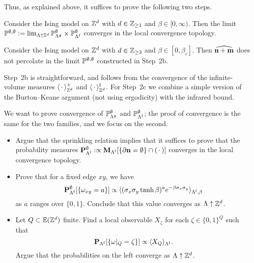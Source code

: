 Thus, as explained above, it suffices to prove the following two steps.

\begin{lemma}\label{lemma:continuity_step2b}
    Consider the Ising model on $\Z^d$ with $d\in\Z_{\geq 1}$
    and $\beta\in[0,\infty)$.
    Then the limit $\P^{\emptyset,\emptyset}:=
        \lim_{\Lambda\uparrow\Z^d}
        \P_{\Lambda^\frakg}^\emptyset\times\P_{\Lambda^\f}^\emptyset
        $ converges in the local convergence topology.
\end{lemma}

\begin{lemma}\label{lemma:continuity_step2c}
    Consider the Ising model on $\Z^d$ with $d\in\Z_{\geq 3}$
    and $\beta\in[0,\beta_c]$.
    Then $\widehat{\n+\m}$ does not percolate in the limit $\P^{\emptyset,\emptyset}$ constructed
    in Step~2b.
\end{lemma}

Step~2b is straightforward, and follows
from the convergence of the infinite-volume measures $\langle\blank\rangle^+_{\Z^d}$
and $\langle\blank\rangle^\f_{\Z^d}$.
For Step~2c we combine a simple version of the Burton--Keane argument
(not using ergodicity)
with the infrared bound.

\begin{exercise}
    We want to prove convergence
    of $\P_{\Lambda^\frakg}^\emptyset$ and $\P_{\Lambda^\f}^\emptyset$;
    the proof of convergence is the same for the two families,
    and we focus on the second.
    \begin{itemize}
        \item Argue that the sprinkling relation implies that it suffices to prove that the probability measures
        $\bfP_{\Lambda^\f}^\emptyset:\propto\bfM_{\Lambda^\f}[\{\partial\n=\emptyset\}\cap(\blank)]$
        converges in the local convergence topology.
        \item Prove that for a fixed edge $xy$,
        we have 
        \[
            \bfP_{\Lambda^\f}^\emptyset[\{\omega_{xy}=a\}]\propto 
            \langle
            (\sigma_x\sigma_y\tanh\beta)^a e^{-\beta\sigma_x\sigma_y}
            \rangle_{\Lambda^\f,\beta}
        \]
        as $a$ ranges over $\{0,1\}$.
        Conclude that this value converges as $\Lambda\uparrow\Z^d$.
        \item Let $Q\subset\E(\Z^d)$ finite.
        Find a local observable $X_\zeta$ for each $\zeta\in\{0,1\}^Q$ such that
        \[
            \bfP_{\Lambda^\f}[\{\omega|_Q=\zeta\}]\propto \langle X_Q\rangle_{\Lambda^\f}.
        \]
        Argue that the probabilities on the left converge as $\Lambda\uparrow\Z^d$.
    \end{itemize}
\end{exercise}


